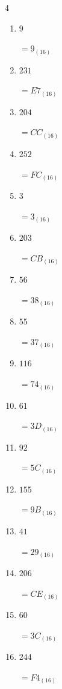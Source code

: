 \begin{multicols}{4}
\begin{enumerate}
        $=E1_{(16)}$

  \item $9$

        $=9_{(16)}$

  \item $231$

        $=E7_{(16)}$

\columnbreak %

  \item $204$

        $=CC_{(16)}$

  \item $252$

        $=FC_{(16)}$

  \item $3$

        $=3_{(16)}$

  \item $203$

        $=CB_{(16)}$

  \item $56$

        $=38_{(16)}$

  \item $55$

        $=37_{(16)}$

  \item $116$

        $=74_{(16)}$

  \item $61$

        $=3D_{(16)}$

  \item $92$

        $=5C_{(16)}$

  \item $155$

        $=9B_{(16)}$

  \item $41$

        $=29_{(16)}$

  \item $206$

        $=CE_{(16)}$

  \item $60$

        $=3C_{(16)}$

  \item $244$

        $=F4_{(16)}$


\end{enumerate}
\end{multicols}
